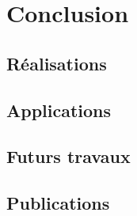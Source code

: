 
\chapter{Conclusion}

\label{ch:conclusions}

\section{Réalisations}


\section{Applications}


\section{Futurs travaux}


\section{Publications}

